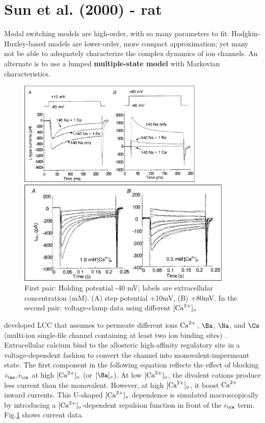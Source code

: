 \section{Sun et al. (2000) - rat }
\label{sec:LCC_Sun2000}

\begin{framed}
Modal switching models are high-order, with so many parameters to fit.
Hodgkin-Huxley-based models are lower-order, more compact approximation; yet
many not be able to adequately characterize the complex dynamics of ion 
channels.  An alternate is to use a lumped {\bf multiple-state model} with
Markovian characteristics. 
  
\end{framed}

\begin{figure}[hbt]
  \centerline{\includegraphics[height=5cm,
    angle=0]{./images/Sun_experiment_1.eps}}
\centerline{\includegraphics[height=5cm,
    angle=0]{./images/Sun_experiment_2.eps}}    
\caption{First pair: Holding potential -40 mV; labels are extracellular
concentration (mM). (A) step potential +10mV, (B) +80mV. In the second pair:
voltage-clamp data using different $[{\text{Ca}^{2+}}]_o$}
\label{fig:Sun_Ica}
\end{figure}

\citep{sun2000mlc} developed LCC that assumes to permeate different ions ${\text{Ca}^{2+}}$,
$\Ba$, $\Na$, and $\Cs$ (multi-ion single-file channel containing at least two
ion binding sites) \citep{hess1984}. Extracellular calcium bind to the
allosteric high-affinity regulatory site in a voltage-dependent fashion to
convert the channel into monovalent-impermeant state. The first component in
the following equation reflects the effect of blocking $i_\na, i_\cs$ at high
$[{\text{Ca}^{2+}}]_o$ (or $[\Ba]_o$). At low $[{\text{Ca}^{2+}}]_o$, the divalent cations produce less
current than the monovalent. However, at high $[{\text{Ca}^{2+}}]_o$, it boost ${\text{Ca}^{2+}}$ inward
currents. This U-shaped $[{\text{Ca}^{2+}}]_o$ dependence is simulated macroscopically by
introducing a $[{\text{Ca}^{2+}}]_o$-dependent repulsion function in front of the $i_\ca$
term. Fig.\ref{fig:Sun_Ica} shows current data.

